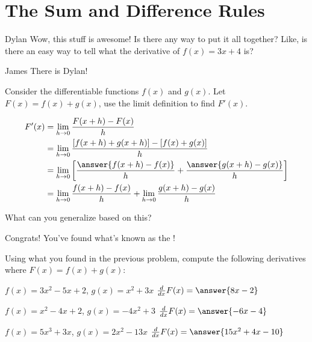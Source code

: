 \documentclass{ximera}
\begin{document}
\section{The Sum and Difference Rules}
\begin{dialogue}
\item[Dylan] Wow, this stuff is awesome! Is there any way to put it all together? Like, is there an easy way to tell what the derivative of $f(x) = 3x+4$ is?
\item[James] There is Dylan!
\end{dialogue}

\begin{question}
Consider the differentiable functions $f(x)$ and $g(x)$. Let $F(x)=f(x)+g(x)$, use the limit definition to find $F'(x)$.

\begin{align*}
F'(x)&= \lim_{h\to 0}\dfrac{F(x+h)-F(x)}{h} \\
&= \lim_{h\to 0}\dfrac{[f(x+h)+g(x+h)]-[f(x)+g(x)]}{h} \\
&= \lim_{h\to 0}\eval{\dfrac{\answer{f(x+h)-f(x)}}{h}+\dfrac{\answer{g(x+h)-g(x)}}{h}} \\
&= \lim_{h\to 0}\dfrac{f(x+h)-f(x)}{h}+\lim_{h\to 0}\dfrac{g(x+h)-g(x)}{h}
\end{align*}

What can you generalize based on this?
\begin{multipleChoice}
\end{multipleChoice}
\begin{feedback}[correct]
Congrats! You've found what's known as the !
\end{feedback}
\end{question}
\begin{question}
Using what you found in the previous problem, compute the following derivatives where $F(x)=f(x)+g(x)$:

$f(x) = 3x^2 - 5x + 2$, $g(x) = x^2 + 3x$ \hspace{11mm} $\frac{d}{dx}F(x) =  \answer{8x-2}$

$f(x) = x^2 - 4x + 2$, $g(x) = -4x^2 + 3$ \hspace{10mm} $\frac{d}{dx}F(x) = \answer{-6x-4}$

$f(x) = 5x^3 + 3x$, $g(x) = 2x^2 - 13x$ \hspace{13mm} $\frac{d}{dx}F(x) =  \answer{15x^2+4x-10}$
\end{question}
\end{document}
